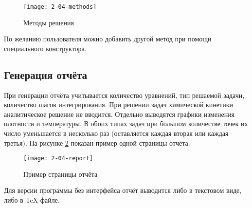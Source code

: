 \begin{figure}
    \texttt{[image: 2-04-methods]}
    \caption{Методы решения}
    \label{fig:SolveMethods}
\end{figure}

По желанию пользователя можно добавить другой метод при помощи специального конструктора.

\subsection{Генерация отчёта}

При генерации отчёта учитывается количество уравнений, тип решаемой задачи, количество шагов интегрирования. При решении задач химической
кинетики аналитическое решение не вводится. Отдельно выводятся графики изменения плотности и температуры. В обоих типах задач при
большом количестве точек их число уменьшается в несколько раз (оставляется каждая вторая или каждая третья). На рисунке \ref{fig:report}
показан пример одной страницы отчёта.

\begin{figure}
    \texttt{[image: 2-04-report]}
    \caption{Пример страницы отчёта}
    \label{fig:report}
\end{figure}

Для версии программы без интерфейса отчёт выводится либо в текстовом виде, либо в TeX-файле.
